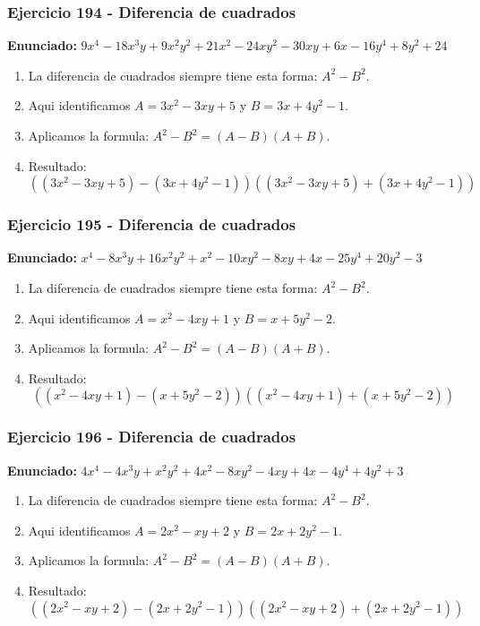 \documentclass[11pt,a4paper]{article}
\begin{document}
\subsubsection*{Ejercicio 194 - Diferencia de cuadrados}
\textbf{Enunciado:} $ 9 x^{4} - 18 x^{3} y + 9 x^{2} y^{2} + 21 x^{2} - 24 x y^{2} - 30 x y + 6 x - 16 y^{4} + 8 y^{2} + 24 $\par
\begin{enumerate}[leftmargin=2em]
\item La diferencia de cuadrados siempre tiene esta forma: \(A^2-B^2\).
\item Aqui identificamos \(A=3 x^{2} - 3 x y + 5\) y \(B=3 x + 4 y^{2} - 1\).
\item Aplicamos la formula: \(A^2-B^2=(A-B)(A+B)\).
\item Resultado: \[\boxed{\left(\left(3 x^{2} - 3 x y + 5\right)-\left(3 x + 4 y^{2} - 1\right)\right)\left(\left(3 x^{2} - 3 x y + 5\right)+\left(3 x + 4 y^{2} - 1\right)\right)}\]
\end{enumerate}

\vspace{0.2cm}
\subsubsection*{Ejercicio 195 - Diferencia de cuadrados}
\textbf{Enunciado:} $ x^{4} - 8 x^{3} y + 16 x^{2} y^{2} + x^{2} - 10 x y^{2} - 8 x y + 4 x - 25 y^{4} + 20 y^{2} - 3 $\par
\begin{enumerate}[leftmargin=2em]
\item La diferencia de cuadrados siempre tiene esta forma: \(A^2-B^2\).
\item Aqui identificamos \(A=x^{2} - 4 x y + 1\) y \(B=x + 5 y^{2} - 2\).
\item Aplicamos la formula: \(A^2-B^2=(A-B)(A+B)\).
\item Resultado: \[\boxed{\left(\left(x^{2} - 4 x y + 1\right)-\left(x + 5 y^{2} - 2\right)\right)\left(\left(x^{2} - 4 x y + 1\right)+\left(x + 5 y^{2} - 2\right)\right)}\]
\end{enumerate}

\vspace{0.2cm}
\subsubsection*{Ejercicio 196 - Diferencia de cuadrados}
\textbf{Enunciado:} $ 4 x^{4} - 4 x^{3} y + x^{2} y^{2} + 4 x^{2} - 8 x y^{2} - 4 x y + 4 x - 4 y^{4} + 4 y^{2} + 3 $\par
\begin{enumerate}[leftmargin=2em]
\item La diferencia de cuadrados siempre tiene esta forma: \(A^2-B^2\).
\item Aqui identificamos \(A=2 x^{2} - x y + 2\) y \(B=2 x + 2 y^{2} - 1\).
\item Aplicamos la formula: \(A^2-B^2=(A-B)(A+B)\).
\item Resultado: \[\boxed{\left(\left(2 x^{2} - x y + 2\right)-\left(2 x + 2 y^{2} - 1\right)\right)\left(\left(2 x^{2} - x y + 2\right)+\left(2 x + 2 y^{2} - 1\right)\right)}\]
\end{enumerate}
\end{document}
